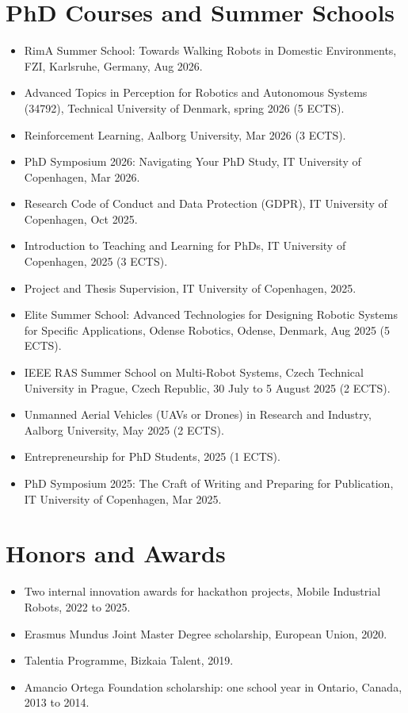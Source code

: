 \documentclass[a4paper,11pt]{article}
\begin{document}
\section{PhD Courses and Summer Schools}
\begin{itemize}
    \item RimA Summer School: Towards Walking Robots in Domestic Environments, FZI, Karlsruhe, Germany, Aug 2026.
    \item Advanced Topics in Perception for Robotics and Autonomous Systems (34792), Technical University of Denmark, spring 2026 (5 ECTS).
    \item Reinforcement Learning, Aalborg University, Mar 2026 (3 ECTS).
    \item PhD Symposium 2026: Navigating Your PhD Study, IT University of Copenhagen, Mar 2026.
    \item Research Code of Conduct and Data Protection (GDPR), IT University of Copenhagen, Oct 2025.
    \item Introduction to Teaching and Learning for PhDs, IT University of Copenhagen, 2025 (3 ECTS).
    \item Project and Thesis Supervision, IT University of Copenhagen, 2025.
    \item Elite Summer School: Advanced Technologies for Designing Robotic Systems for Specific Applications, Odense Robotics, Odense, Denmark, Aug 2025 (5 ECTS).
    \item IEEE RAS Summer School on Multi-Robot Systems, Czech Technical University in Prague, Czech Republic, 30 July to 5 August 2025 (2 ECTS).
    \item Unmanned Aerial Vehicles (UAVs or Drones) in Research and Industry, Aalborg University, May 2025 (2 ECTS).
    \item Entrepreneurship for PhD Students, 2025 (1 ECTS).
    \item PhD Symposium 2025: The Craft of Writing and Preparing for Publication, IT University of Copenhagen, Mar 2025.
\end{itemize}

\section{Honors and Awards}
\begin{itemize}
    \item Two internal innovation awards for hackathon projects, Mobile Industrial Robots, 2022 to 2025.
    \item Erasmus Mundus Joint Master Degree scholarship, European Union, 2020.
    \item Talentia Programme, Bizkaia Talent, 2019.
    \item Amancio Ortega Foundation scholarship: one school year in Ontario, Canada, 2013 to 2014.
\end{itemize}
\end{document}
